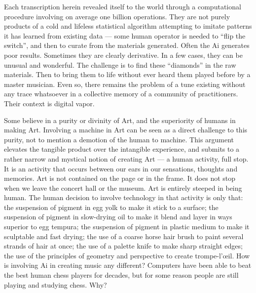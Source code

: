 \documentclass[a4paper,notitlepage,twoside]{book}
\begin{document}
Each transcription herein revealed itself to the world 
through a computational procedure involving on average one billion operations.
They are not purely products of a cold and lifeless statistical algorithm 
attempting to imitate patterns it has learned from existing data ---
some human operator is needed to ``flip the switch'',
and then to curate from the materials generated.
Often the Ai generates poor results. 
Sometimes they are clearly derivative.
In a few cases, they can be unusual and wonderful.
The challenge is to find these ``diamonds'' in the raw materials.
Then to bring them to life without ever heard them
played before by a master musician.
Even so, there remains the problem
of a tune existing without any trace whatsoever 
in a collective memory of a community of practitioners.
Their context is digital vapor.

Some believe in a purity or divinity of Art, and the superiority of humans in making Art. 
Involving a machine in Art can be seen as a direct challenge to this purity, 
not to mention a demotion of the human to machine. 
This argument elevates the tangible product over the intangible experience, 
and submits to a rather narrow and mystical notion of creating Art ---
a human activity, full stop. It is an activity that occurs between our ears in our sensations, thoughts and memories. Art is not contained on the page or in the frame. It does not stop when we leave the concert hall or the museum. Art is entirely steeped in being human. The human decision to involve technology in that activity is only that: the suspension of pigment in egg yolk to make it stick to a surface; the suspension of pigment in slow-drying oil to make it blend and layer in ways superior to egg tempura; the suspension of pigment in plastic medium to make it sculptable and fast drying; the use of a coarse horse hair brush to paint several strands of hair at once; the use of a palette knife to make sharp straight edges; the use of the principles of geometry and perspective to create trompe-l'œil. How is involving Ai in creating music any different? 
Computers have been able to beat the best human chess players for decades, 
but for some reason people are still playing and studying chess. Why?
\end{document}
